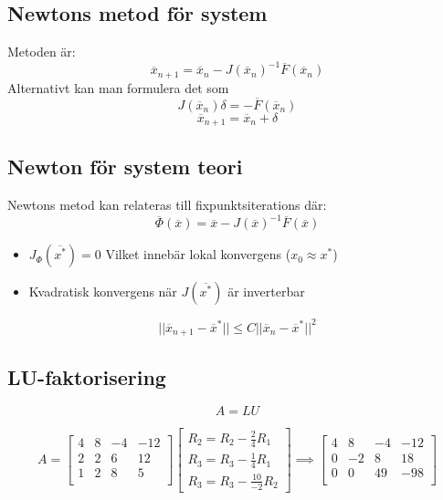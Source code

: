 \documentclass[a4paper,11pt]{article}
\begin{document}
\subsection{Newtons metod för system}
Metoden är:
$$\overline{x}_{n+1} = \overline{x}_n - J(\overline{x}_n)^{-1}\overline{F}(\overline{x}_n)$$
Alternativt kan man formulera det som 
$$J(\overline{x}_n)\delta = -\overline{F}(\overline{x}_n)$$
$$\overline{x}_{n+1} = \overline{x}_n + \delta$$

\subsection{Newton för system teori}
Newtons metod kan relateras till fixpunktsiterations där:
$$\overline{\Phi}(\overline{x}) = \overline{x} - J(\overline{x})^{-1}\overline{F}(\overline{x})$$
\begin{itemize}
    \item $J_{\Phi}(\overline{x^*}) = 0$ Vilket innebär lokal konvergens ($x_0 \approx x^*$)
    \item Kvadratisk konvergens när $J(\overline{x^*})$ är inverterbar
\end{itemize}
$$||\overline{x}_{n+1} - \overline{x}^*|| \leq C||\overline{x}_n - \overline{x}^*||^2$$

\subsection{LU-faktorisering}
\[ A = LU \]

\[ 
A = \left[
\begin{array}{ccc|c}
    4 & 8 & -4 & -12 \\
    2 & 2 & 6 & 12 \\
    1 & 2 & 8 & 5 \\
\end{array}
\right]
\left[
\begin{array}{ccc}
    R_2 = R_2 - \frac{2}{4}R_1 \\
    R_3 = R_3 - \frac{1}{4}R_1 \\
    R_3 = R_3 - \frac{10}{-2}R_2
\end{array}
\right]
\implies
\left[
    \begin{array}{ccc|c}
        4 & 8 & -4 & -12 \\
        0 & -2 & 8 & 18 \\
        0 & 0 & 49 & -98 \\  
    \end{array}
\right]
\]
\end{document}
